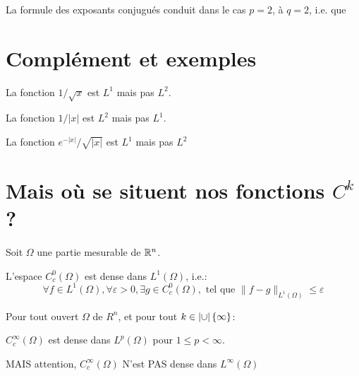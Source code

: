 \medskip
{}

\medskip
La formule des exposants conjugués conduit dans le cas $p=2$, à $q=2$, i.e.
que 

\medskip
\section{Complément et exemples}


\bigskip
La fonction $1/\sqrt{x}$ est $L^1$ mais pas $L^2$.

La fonction $1/|x|$ est $L^2$ mais pas $L^1$.

La fonction $e^{-|x|}/\sqrt{|x|}$ est $L^1$ mais pas $L^2$

\medskip
\section{Mais où se situent nos fonctions $C^k$?}

Soit $\Omega$ une partie mesurable de $\mathbb R^n$.

L'espace $C_c^0(\Omega)$ est dense dans $L^1(\Omega)$, i.e.:
\begin{equation}
\forall f\in L^1(\Omega), \forall\varepsilon>0, \exists g\in C_ c^0(\Omega), \text{ tel que }
\|f-g\|_{L^1(\Omega)}\le\varepsilon
\end{equation}

\medskip
Pour tout ouvert $\Omega$ de $R^n$, et pour tout $k\in\left| \cup\right|\{\infty\}$:

$C_c^\infty(\Omega)$ est dense dans $L^p(\Omega)$ pour $1\le p<\infty$.

MAIS attention, $C_c^\infty(\Omega)$ N'est PAS dense dans $L^\infty(\Omega)$
